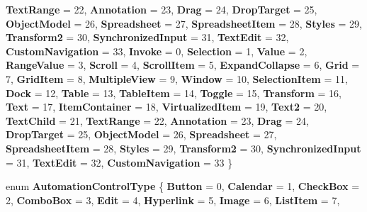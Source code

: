 \begin{DoxyCompactItemize}
\newline
{\bfseries Text\+Range} = 22, 
{\bfseries Annotation} = 23, 
{\bfseries Drag} = 24, 
{\bfseries Drop\+Target} = 25, 
\newline
{\bfseries Object\+Model} = 26, 
{\bfseries Spreadsheet} = 27, 
{\bfseries Spreadsheet\+Item} = 28, 
{\bfseries Styles} = 29, 
\newline
{\bfseries Transform2} = 30, 
{\bfseries Synchronized\+Input} = 31, 
{\bfseries Text\+Edit} = 32, 
{\bfseries Custom\+Navigation} = 33, 
\newline
{\bfseries Invoke} = 0, 
{\bfseries Selection} = 1, 
{\bfseries Value} = 2, 
{\bfseries Range\+Value} = 3, 
\newline
{\bfseries Scroll} = 4, 
{\bfseries Scroll\+Item} = 5, 
{\bfseries Expand\+Collapse} = 6, 
{\bfseries Grid} = 7, 
\newline
{\bfseries Grid\+Item} = 8, 
{\bfseries Multiple\+View} = 9, 
{\bfseries Window} = 10, 
{\bfseries Selection\+Item} = 11, 
\newline
{\bfseries Dock} = 12, 
{\bfseries Table} = 13, 
{\bfseries Table\+Item} = 14, 
{\bfseries Toggle} = 15, 
\newline
{\bfseries Transform} = 16, 
{\bfseries Text} = 17, 
{\bfseries Item\+Container} = 18, 
{\bfseries Virtualized\+Item} = 19, 
\newline
{\bfseries Text2} = 20, 
{\bfseries Text\+Child} = 21, 
{\bfseries Text\+Range} = 22, 
{\bfseries Annotation} = 23, 
\newline
{\bfseries Drag} = 24, 
{\bfseries Drop\+Target} = 25, 
{\bfseries Object\+Model} = 26, 
{\bfseries Spreadsheet} = 27, 
\newline
{\bfseries Spreadsheet\+Item} = 28, 
{\bfseries Styles} = 29, 
{\bfseries Transform2} = 30, 
{\bfseries Synchronized\+Input} = 31, 
\newline
{\bfseries Text\+Edit} = 32, 
{\bfseries Custom\+Navigation} = 33
 \}
\item 
\mbox{\label{namespace_windows_1_1_u_i_1_1_xaml_1_1_automation_1_1_peers_a545d04e5cb3e01155ab597d749495a0f}} 
enum {\bfseries Automation\+Control\+Type} \{ \newline
{\bfseries Button} = 0, 
{\bfseries Calendar} = 1, 
{\bfseries Check\+Box} = 2, 
{\bfseries Combo\+Box} = 3, 
\newline
{\bfseries Edit} = 4, 
{\bfseries Hyperlink} = 5, 
{\bfseries Image} = 6, 
{\bfseries List\+Item} = 7, 

\end{DoxyCompactItemize}

